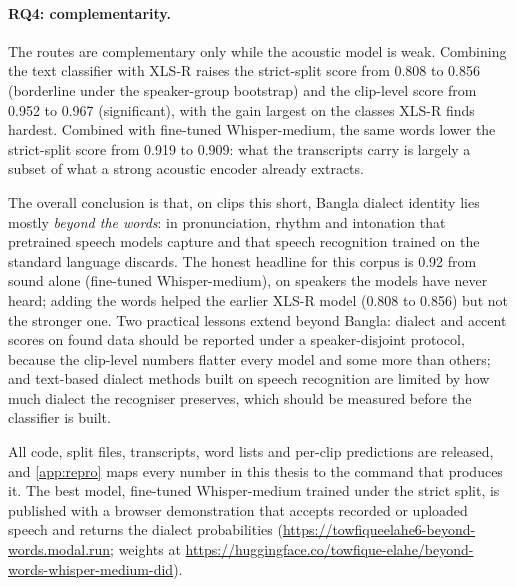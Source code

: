 \paragraph{RQ4: complementarity.} The routes are complementary only while
the acoustic model is weak. Combining the text classifier with XLS-R raises the
strict-split score from 0.808 to 0.856 (borderline under the speaker-group
bootstrap) and the clip-level score from 0.952 to 0.967 (significant), with the
gain largest on the classes XLS-R finds hardest. Combined with fine-tuned
Whisper-medium, the same words lower the strict-split score from 0.919 to
0.909: what the transcripts carry is largely a subset of what a strong acoustic
encoder already extracts.

\medskip
The overall conclusion is that, on clips this short, Bangla dialect identity lies
mostly \emph{beyond the words}: in pronunciation, rhythm and intonation that
pretrained speech models capture and that speech recognition trained on the
standard language discards. The honest headline for this corpus is 0.92 from
sound alone (fine-tuned Whisper-medium), on speakers the models have never
heard; adding the words helped the earlier XLS-R model (0.808 to 0.856) but
not the stronger one.
Two practical lessons extend beyond Bangla: dialect and accent scores on found
data should be reported under a speaker-disjoint protocol, because the
clip-level numbers flatter every model and some more than others; and text-based
dialect methods built on speech recognition are limited by how much dialect the
recogniser preserves, which should be measured before the classifier is built.

All code, split files, transcripts, word lists and per-clip predictions are
released, and \cref{app:repro} maps every number in this thesis to the command
that produces it. The best model, fine-tuned Whisper-medium trained under the
strict split, is published with a browser demonstration that accepts recorded
or uploaded speech and returns the dialect probabilities
(\url{https://towfiqueelahe6-beyond-words.modal.run};
weights at \url{https://huggingface.co/towfique-elahe/beyond-words-whisper-medium-did}).
